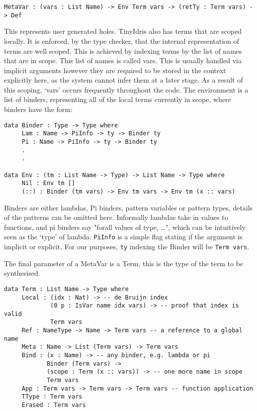 \documentclass[a4paper]{article}
\begin{document}
\begin{verbatim}
MetaVar : (vars : List Name) -> Env Term vars -> (retTy : Term vars) -> Def
\end{verbatim}

This represents user generated holes. TinyIdris also has terms that are scoped locally. It is enforced, by the type checker,
that the internal representation of terms are well scoped. 
This is achieved by indexing terms by the list of names that are in scope. This list of names is called vars. 
This is usually handled via implicit arguments however they are required to be stored in the context explicitly here, 
as the system cannot infer them at a later stage. As a result of this scoping, `vars' occurs frequently throughout the code.
The environment is a list of binders, representing all of the local terms currently in scope, where binders have the form:

\begin{center}
\begin{verbatim}
data Binder : Type -> Type where
	 Lam : Name -> PiInfo -> ty -> Binder ty
	 Pi : Name -> PiInfo -> ty -> Binder ty
	 .
	 .

data Env : (tm : List Name -> Type) -> List Name -> Type where
	 Nil : Env tm []
	 (::) : Binder (tm vars) -> Env tm vars -> Env tm (x :: vars)
\end{verbatim}
\end{center}

Binders are either lambdas, Pi binders, pattern variables or pattern types, details of the patterns can be omitted here.
Informally lambdas take in values to functions, and pi binders say
"forall values of type, \ldots{}", which can be intuitively seen as the `type' of lambda.
\texttt{PiInfo} is a simple flag stating if the argument is implicit or explicit. For our purposes, \texttt{ty} indexing the Binder will be \texttt{Term vars}.

The final parameter of a MetaVar is a Term, this is the type of the term to be synthesised.

\begin{center}
\begin{verbatim}
data Term : List Name -> Type where
	 Local : (idx : Nat) -> -- de Bruijn index
			 (0 p : IsVar name idx vars) -> -- proof that index is valid
			 Term vars
	 Ref : NameType -> Name -> Term vars -- a reference to a global name
	 Meta : Name -> List (Term vars) -> Term vars
	 Bind : (x : Name) -> -- any binder, e.g. lambda or pi
			Binder (Term vars) ->
			(scope : Term (x :: vars)) -> -- one more name in scope
			Term vars
	 App : Term vars -> Term vars -> Term vars -- function application
	 TType : Term vars
	 Erased : Term vars
\end{verbatim}
\end{center}
\end{document}
